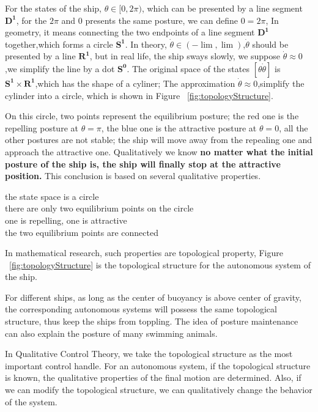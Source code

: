 \begin{description}
For the states of the ship, $\theta \in [0,2\pi)$, which can be presented by a line segment $\mathbf{D^{1}}$,
for the $2\pi$ and $0$ presents the same posture, we can define $0=2\pi$,
In geometry, it means connecting the two endpoints of a line segment $\mathbf{D^{1}}$ together,which forms a circle $\mathbf{S^{1}}$.
In theory, $\dot{\theta} \in (-\lim ,\lim)$,$\dot{\theta}$ should be presented by a line $\mathbf{R^{1}}$, 
but in real life, the ship sways slowly, we suppose $\dot{\theta}\approx 0$,we simplify the line by a dot $\mathbf{S^{0}}$.
The original space of the states $[\theta \dot{\theta}]$ is $\mathbf{S^{1}}\times \mathbf{R^{1}}$,which has the shape of a cyliner;
The approximation $\dot{\theta} \approx 0$,simplify the cylinder into a circle, which is shown in Figure ~\ref{fig:topologyStructure}.



On this circle, two points represent the equilibrium posture; 
the red one is the repelling posture at $\theta = \pi$, 
the blue one is the attractive posture at $\theta =0$, 
all the other postures are not stable; the ship will move away from the repealing one and approach the attractive one. 
Qualitatively we know 
\textbf{no matter what the initial posture of the ship is, 
the ship will finally stop at the attractive position.}
This conclusion is based on several qualitative properties.
\begin{description}
\item [the state space is a circle]
\item [there are only two equilibrium points on the circle]
\item [one is repelling, one is attractive]
\item [the two equilibrium points are connected]
\end{description}

In mathematical research,
such properties are topological property,
Figure ~\ref{fig:topologyStructure} is the topological structure for the autonomous system of the ship.

For different ships, as long as the center of buoyancy is above center of gravity,
the corresponding autonomous systems will possess the same topological structure,
thus keep the ships from toppling.
The idea of posture maintenance can also explain the posture of many swimming animals.

In Qualitative Control Theory, 
we take the topological structure as the most important control handle.
For an autonomous system, if the topological structure is known, the qualitative properties of the final motion are determined.
Also, if we can modify the topological structure, we can qualitatively change the behavior of the system.


\end{description}
